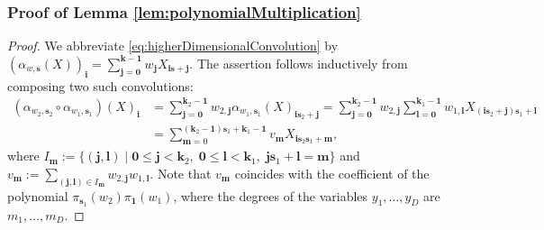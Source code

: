 \documentclass[twoside]{article}
\theoremstyle{definition}
\theoremstyle{remark}
\begin{document}
\subsubsection{Proof of Lemma \ref{lem:polynomialMultiplication}}
\begin{proof}
    We abbreviate \eqref{eq:higherDimensionalConvolution} by $(\alpha_{w,\boldsymbol{s}}(X))_{\boldsymbol{i}} = \sum_{\boldsymbol{j}=\boldsymbol{0}}^{\boldsymbol{k}-\boldsymbol{1}} w_{\boldsymbol{j}} X_{\boldsymbol{i}\boldsymbol{s}+\boldsymbol{j}}$.
    The assertion follows inductively from composing two such convolutions:
    \begin{align*}       (\alpha_{w_2,\boldsymbol{s}_2}\circ \alpha_{w_1,\boldsymbol{s}_1})(X)_{\boldsymbol{i}} &= \sum_{\boldsymbol{j}=\boldsymbol{0}}^{\boldsymbol{k}_2-\boldsymbol{1}} w_{2,\boldsymbol{j}} \alpha_{w_1,\boldsymbol{s}_1}(X)_{\boldsymbol{i} \boldsymbol{s}_2 + \boldsymbol{j}} 
        = \sum_{\boldsymbol{j}=\boldsymbol{0}}^{\boldsymbol{k}_2-\boldsymbol{1}} w_{2,\boldsymbol{j}}  \sum_{\boldsymbol{l}=\boldsymbol{0}}^{\boldsymbol{k}_1-\boldsymbol{1}} w_{1,\boldsymbol{l}} 
        X_{(\boldsymbol{i} \boldsymbol{s}_2 + \boldsymbol{j})\boldsymbol{s}_1+\boldsymbol{l}} \\
        &= \sum_{\boldsymbol{m}=0}^{(\boldsymbol{k}_2-\boldsymbol{1})\boldsymbol{s}_1+\boldsymbol{k}_1-\boldsymbol{1}}
        v_{\boldsymbol{m}} X_{\boldsymbol{i} \boldsymbol{s}_2\boldsymbol{s}_1+\boldsymbol{m}},
    \end{align*}
    where  
    $ I_{\boldsymbol{m}} := \{ (\boldsymbol{j},\boldsymbol{l}) \mid \boldsymbol{0} \leq \boldsymbol{j} < \boldsymbol{k}_2, \; \boldsymbol{0} \leq \boldsymbol{l} < \boldsymbol{k}_1,  \;   \boldsymbol{j}\boldsymbol{s}_1+\boldsymbol{l}=\boldsymbol{m} \}$ and $v_{\boldsymbol{m}} := \sum_{(\boldsymbol{j},\boldsymbol{l}) \in I_{\boldsymbol{m}}} w_{2,\boldsymbol{j}}w_{1,\boldsymbol{l}}$.
    Note that $v_{\boldsymbol{m}}$ coincides with the coefficient of the polynomial $\pi_{\boldsymbol{s}_1}(w_2)\pi_{\boldsymbol{1}}(w_1)$, where the degrees of the variables $y_1, \ldots, y_D$ are $m_1, \ldots, m_D$.
\end{proof}
\end{document}
